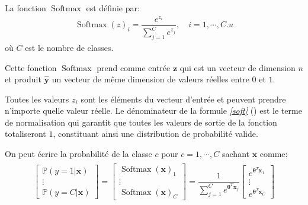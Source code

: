 \documentclass[letterpaper,11pt,english]{sphinxmanual}
\begin{document}
\sphinxAtStartPar
La fonction \(\operatorname{Softmax}\) est définie par:
\begin{equation}\label{equation:chapter3:chapter3:41}
\begin{split}\operatorname{Softmax}(z)_i=\dfrac{e^{z_i}} {\sum_{j=1}^{C} e^{z_{j}}}, \quad i=1,\cdots, C.
u\end{split}
\end{equation}
\sphinxAtStartPar
où \(C\) est le nombre de classes.

\sphinxAtStartPar
Cette fonction \(\operatorname{Softmax}\) prend comme entrée
\(\mathbf{z}\) qui est un vecteur de dimension \(n\) et produit
\(\mathbf{\hat{y}}\) un vecteur de même dimension de valeurs réelles
entre \(0\) et \(1\).

\sphinxAtStartPar
Toutes les valeurs \(z_{i}\) sont les éléments du vecteur d’entrée
et peuvent prendre n’importe quelle valeur réelle. Le dénominateur de la
formule {\hyperref[\detokenize{chapter3:soft}]{\emph{{[}soft{]}}}} () est le terme de normalisation qui garantit
que toutes les valeurs de sortie de la fonction totaliseront \(1\),
constituant ainsi une distribution de probabilité valide.

\sphinxAtStartPar
On peut écrire la probabilité de la classe \(c\) pour
\(c=1,\cdots,C\) sachant \(\mathbf{x}\) comme:
\begin{equation}\label{equation:chapter3:chapter3:42}
\begin{split}\begin{aligned}
\begin{bmatrix}
\mathbb{P}(y=1|\mathbf{x}) \\
\vdots \\
\mathbb{P}(y=C|\mathbf{x})
\end{bmatrix} =
\begin{bmatrix}
\operatorname{Softmax}(\mathbf{x})_{1} \\
\vdots \\
\operatorname{Softmax}(\mathbf{x})_{C}
\end{bmatrix}=
\dfrac{1}{\sum_{j=1}^{C}e^{\boldsymbol{\theta}^T \mathbf{x}_{j}}}
\begin{bmatrix}
e^{\boldsymbol{\theta}^T \mathbf{x}_1}\\
\vdots \\
e^{\boldsymbol{\theta}^T \mathbf{x}_{C}}
\end{bmatrix}\end{aligned}\end{split}
\end{equation}
\end{document}
